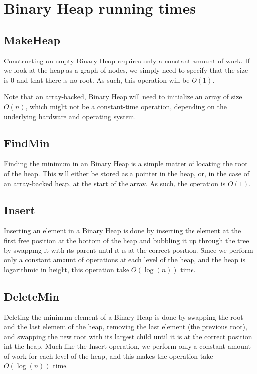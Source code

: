 \section{Binary Heap running times}

\subsection{MakeHeap}
Constructing an empty Binary Heap requires only a constant amount of work. If we look at the heap as a graph of nodes, we simply need to specify that the size is 0 and that there is no root. As such, this operation will be $O(1)$.

Note that an array-backed, Binary Heap will need to initialize an array of size $O(n)$, which might not be a constant-time operation, depending on the underlying hardware and operating system.

\subsection{FindMin}
Finding the minimum in an Binary Heap is a simple matter of locating the root of the heap. This will either be stored as a pointer in the heap, or, in the case of an array-backed heap, at the start of the array. As such, the operation is $O(1)$.

\subsection{Insert}
Inserting an element in a Binary Heap is done by inserting the element at the first free position at the bottom of the heap and bubbling it up through the tree by swapping it with its parent until it is at the correct position. Since we perform only a constant amount of operations at each level of the heap, and the heap is logarithmic in height, this operation take $O(\log (n))$ time.

\subsection{DeleteMin}
Deleting the minimum element of a Binary Heap is done by swapping the root and the last element of the heap, removing the last element (the previous root), and swapping the new root with its largest child until it is at the correct position int the heap. Much like the Insert operation, we perform only a constant amount of work for each level of the heap, and this makes the operation take $O(\log (n))$ time.

